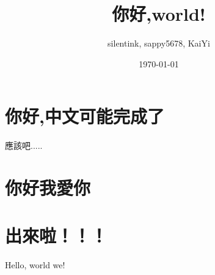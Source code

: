 \documentclass[UTF8,12pt,a4paper]{article}
\title{你好,world!}
\author{silentink, sappy5678, KaiYi}
\date{\today}
\begin{document}
\maketitle
\section{你好,中文可能完成了}

應該吧.....
\section{你好我愛你}

\section{出來啦！！！}
Hello, world we!
\end{document}
